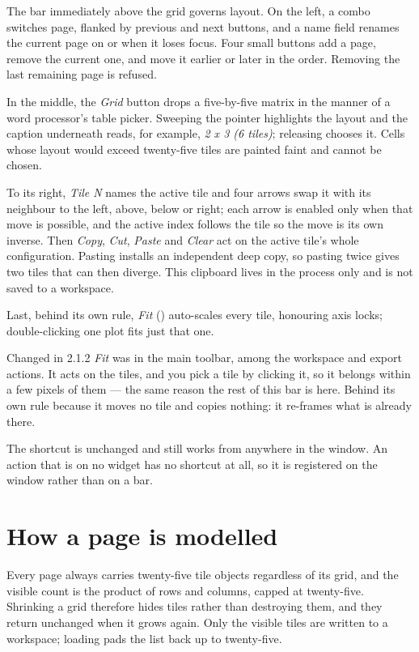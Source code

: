 \documentclass[11pt,a4paper,oneside]{report}
\newcommand{\appver}{2.1.2}
\newcommand{\key}[1]{\textsf{\small\fbox{#1}}}
\begin{document}
The bar immediately above the grid governs layout. On the left, a combo switches
page, flanked by previous and next buttons, and a name field renames the current
page on \key{Enter} or when it loses focus. Four small buttons add a page,
remove the current one, and move it earlier or later in the order. Removing the
last remaining page is refused.

In the middle, the \emph{Grid} button drops a five-by-five matrix in the manner
of a word processor's table picker. Sweeping the pointer highlights the layout
and the caption underneath reads, for example, \emph{2 x 3 (6 tiles)}; releasing
chooses it. Cells whose layout would exceed twenty-five tiles are painted faint
and cannot be chosen.

To its right, \emph{Tile N} names the active tile and four arrows swap it with
its neighbour to the left, above, below or right; each arrow is enabled only when
that move is possible, and the active index follows the tile so the move is its
own inverse. Then \emph{Copy}, \emph{Cut}, \emph{Paste} and \emph{Clear} act
on the active tile's whole configuration. Pasting installs an independent deep
copy, so pasting twice gives two tiles that can then diverge. This clipboard
lives in the process only and is not saved to a workspace.

Last, behind its own rule, \emph{Fit} (\key{Ctrl+0}) auto-scales every tile,
honouring axis locks; double-clicking one plot fits just that one.

\begin{aoenew}{Changed in \appver}
\emph{Fit} was in the main toolbar, among the workspace and export actions. It
acts on the tiles, and you pick a tile by clicking it, so it belongs within a
few pixels of them --- the same reason the rest of this bar is here. Behind its
own rule because it moves no tile and copies nothing: it re-frames what is
already there.

The shortcut is unchanged and still works from anywhere in the window. An
action that is on no widget has no shortcut at all, so it is registered on the
window rather than on a bar.
\end{aoenew}

\section{How a page is modelled}

Every page always carries twenty-five tile objects regardless of its grid, and
the visible count is the product of rows and columns, capped at twenty-five.
Shrinking a grid therefore hides tiles rather than destroying them, and they
return unchanged when it grows again. Only the visible tiles are written to a
workspace; loading pads the list back up to twenty-five.
\end{document}
